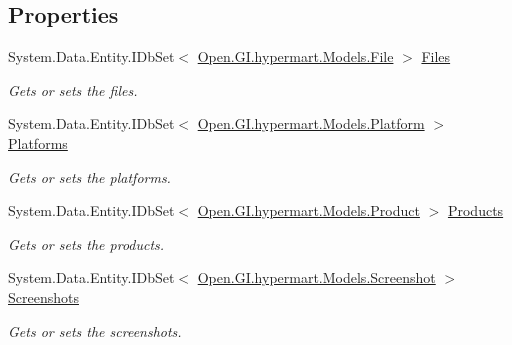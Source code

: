\subsection*{Properties}
\begin{DoxyCompactItemize}
\item 
System.\+Data.\+Entity.\+I\+Db\+Set$<$ \hyperlink{class_open_1_1_g_i_1_1hypermart_1_1_models_1_1_file}{Open.\+G\+I.\+hypermart.\+Models.\+File} $>$ \hyperlink{interface_open_1_1_g_i_1_1hypermart_1_1_d_a_l_1_1_i_hypermart_context_a43675ffb78127ee6af56534c51d593c5}{Files}
\begin{DoxyCompactList}\small\item\em Gets or sets the files. \end{DoxyCompactList}\item 
System.\+Data.\+Entity.\+I\+Db\+Set$<$ \hyperlink{class_open_1_1_g_i_1_1hypermart_1_1_models_1_1_platform}{Open.\+G\+I.\+hypermart.\+Models.\+Platform} $>$ \hyperlink{interface_open_1_1_g_i_1_1hypermart_1_1_d_a_l_1_1_i_hypermart_context_a555845fae4537e83a55b431d87b6642e}{Platforms}
\begin{DoxyCompactList}\small\item\em Gets or sets the platforms. \end{DoxyCompactList}\item 
System.\+Data.\+Entity.\+I\+Db\+Set$<$ \hyperlink{class_open_1_1_g_i_1_1hypermart_1_1_models_1_1_product}{Open.\+G\+I.\+hypermart.\+Models.\+Product} $>$ \hyperlink{interface_open_1_1_g_i_1_1hypermart_1_1_d_a_l_1_1_i_hypermart_context_addebf65ed282146ad46149f0a4575ec7}{Products}
\begin{DoxyCompactList}\small\item\em Gets or sets the products. \end{DoxyCompactList}\item 
System.\+Data.\+Entity.\+I\+Db\+Set$<$ \hyperlink{class_open_1_1_g_i_1_1hypermart_1_1_models_1_1_screenshot}{Open.\+G\+I.\+hypermart.\+Models.\+Screenshot} $>$ \hyperlink{interface_open_1_1_g_i_1_1hypermart_1_1_d_a_l_1_1_i_hypermart_context_ab60981916a8ecd6e871be2f4cb699b19}{Screenshots}
\begin{DoxyCompactList}\small\item\em Gets or sets the screenshots. \end{DoxyCompactList}\item 

\end{DoxyCompactItemize}
